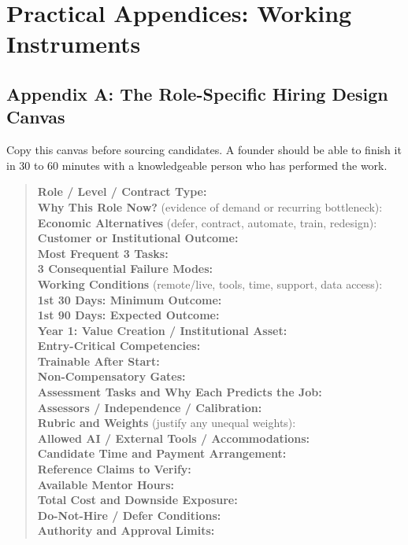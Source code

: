 \section*{Practical Appendices: Working Instruments}

\subsection*{Appendix A: The Role-Specific Hiring Design Canvas}

Copy this canvas before sourcing candidates. A founder should be able to finish it in 30 to 60 minutes with a knowledgeable person who has performed the work.

\begin{quote}
\small
\noindent\textbf{Role / Level / Contract Type:}\\
\textbf{Why This Role Now?} (evidence of demand or recurring bottleneck):\\
\textbf{Economic Alternatives} (defer, contract, automate, train, redesign):\\
\textbf{Customer or Institutional Outcome:}\\
\textbf{Most Frequent 3 Tasks:}\\
\textbf{3 Consequential Failure Modes:}\\
\textbf{Working Conditions} (remote/live, tools, time, support, data access):\\
\textbf{1st 30 Days: Minimum Outcome:}\\
\textbf{1st 90 Days: Expected Outcome:}\\
\textbf{Year 1: Value Creation / Institutional Asset:}\\
\textbf{Entry-Critical Competencies:}\\
\textbf{Trainable After Start:}\\
\textbf{Non-Compensatory Gates:}\\
\textbf{Assessment Tasks and Why Each Predicts the Job:}\\
\textbf{Assessors / Independence / Calibration:}\\
\textbf{Rubric and Weights} (justify any unequal weights):\\
\textbf{Allowed AI / External Tools / Accommodations:}\\
\textbf{Candidate Time and Payment Arrangement:}\\
\textbf{Reference Claims to Verify:}\\
\textbf{Available Mentor Hours:}\\
\textbf{Total Cost and Downside Exposure:}\\
\textbf{Do-Not-Hire / Defer Conditions:}\\
\textbf{Authority and Approval Limits:}
\end{quote}

